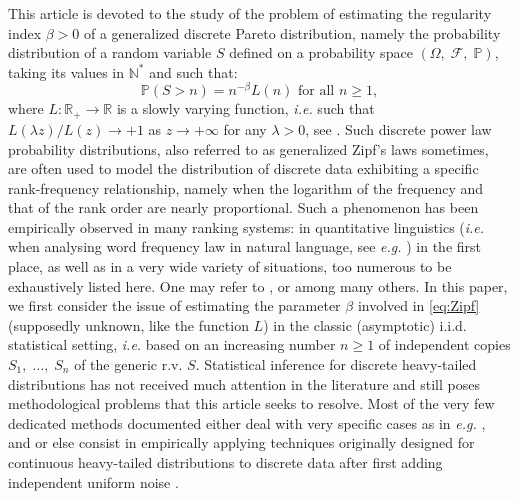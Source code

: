 \documentclass[sn-mathphys-ay]{sn-jnl}%
\renewcommand{\P}{\mathbb{P}}
\begin{document}
This article is devoted to the study of the problem of estimating the regularity index
$\beta>0$ of a generalized discrete Pareto distribution, namely the probability
distribution of a random variable $S$ defined on a probability space $(\Omega,\;
    \mathcal{F},\; \mathbb{P})$, taking its values in $\mathbb{N}^*$ and such that:
\begin{equation}\label{eq:Zipf}
    \P\left( {S > n} \right) = {n^{ - \beta }}L\left( n \right) \text{ for all } n\geq 1,
\end{equation}
where $L:\mathbb{R}_+\to \mathbb{R}$ is a slowly varying function, \textit{i.e.} such
that $L(\lambda z)/L(z)\rightarrow +1$ as $z\rightarrow +\infty$ for any $\lambda>0$, see
\cite{Bingham1987}.
Such discrete power law probability distributions, also referred to
as generalized Zipf's laws sometimes, are often used to model the distribution of
discrete data exhibiting a specific rank-frequency relationship, namely when the
logarithm of the frequency and that of the rank order are nearly proportional. Such a
phenomenon has been empirically observed in many ranking systems: in quantitative
linguistics (\textit{i.e.} when analysing word frequency law in natural language, see
\textit{e.g.} \cite{Manning}) in the first place, as well as in a very wide variety of
situations, too numerous to be exhaustively listed here. One may refer to \cite{SSBN18},
\cite{Lazzardi2021.06.16.448706} or \cite{Zanette} among many others. In this paper, we
first consider the issue of estimating the parameter $\beta$ involved in \eqref{eq:Zipf}
(supposedly unknown, like the function $L$) in the classic (asymptotic) i.i.d.
statistical setting, \textit{i.e.} based on an increasing number $n\geq 1$ of independent
copies $S_1,\; \ldots,\; S_n$ of the generic r.v. $S$. Statistical inference for discrete
heavy-tailed distributions has not received much attention in the literature and still poses methodological problems that this article seeks to resolve. Most of the
very few dedicated methods documented either deal with very specific cases as in
\textit{e.g.} \cite{goldstein2004}, \cite{Matsui2013} and \cite{clauset2009power} or else
consist in empirically applying techniques originally designed for continuous heavy-tailed
distributions to discrete data after first adding independent uniform noise \citep{Voitalov2019,kim2020consistency, kim2023asymptotic}.
\end{document}
